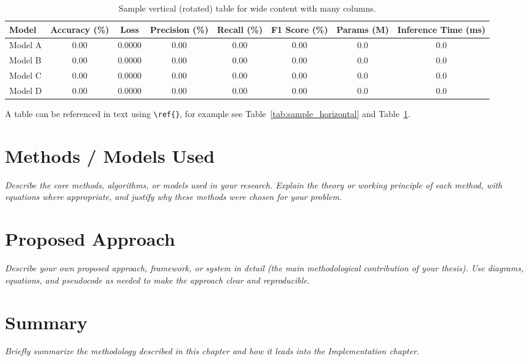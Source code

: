 \begin{spacing}{1.5}
\begin{table}
\centering
\captionsetup{font=small}
\caption{Sample vertical (rotated) table for wide content with many columns.}
\label{tab:sample_vertical}
\begin{tabular}{@{}lccccccc@{}}
\toprule
\textbf{Model} & \textbf{Accuracy (\%)} & \textbf{Loss} & \textbf{Precision (\%)} & \textbf{Recall (\%)} & \textbf{F1 Score (\%)} & \textbf{Params (M)} & \textbf{Inference Time (ms)} \\
\midrule
Model A & 0.00 & 0.0000 & 0.00 & 0.00 & 0.00 & 0.0 & 0.0 \\
Model B & 0.00 & 0.0000 & 0.00 & 0.00 & 0.00 & 0.0 & 0.0 \\
Model C & 0.00 & 0.0000 & 0.00 & 0.00 & 0.00 & 0.0 & 0.0 \\
Model D & 0.00 & 0.0000 & 0.00 & 0.00 & 0.00 & 0.0 & 0.0 \\
\bottomrule
\end{tabular}
\end{table}

A table can be referenced in text using \texttt{\textbackslash ref\{\}}, for example see Table~\ref{tab:sample_horizontal} and Table~\ref{tab:sample_vertical}.

\section{Methods / Models Used}\label{subsec2}

\textit{Describe the core methods, algorithms, or models used in your research. Explain the theory or working principle of each method, with equations where appropriate, and justify why these methods were chosen for your problem.}

\section{Proposed Approach}\label{subsec3}

\textit{Describe your own proposed approach, framework, or system in detail (the main methodological contribution of your thesis). Use diagrams, equations, and pseudocode as needed to make the approach clear and reproducible.}

\section{Summary}

\textit{Briefly summarize the methodology described in this chapter and how it leads into the Implementation chapter.}

\end{spacing}
